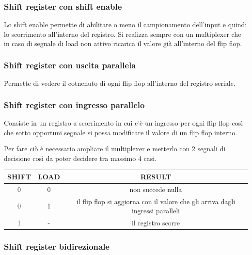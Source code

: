 \documentclass[a4paper]{book}
\begin{document}
\subsubsection*{Shift register con shift enable}

Lo shift enable permette di abilitare o meno il campionamento dell'input e quindi lo scorrimento all'interno del registro.
Si realizza sempre con un multiplexer che in caso di segnale di load non attivo ricarica il valore già all'interno del flip flop.

\subsubsection*{Shift register con uscita parallela}

Permette di vedere il cotnenuto di ogni flip flop all'interno del registro seriale.

\subsubsection*{Shift register con ingresso parallelo}

Consiste in un registro a scorrimento in cui c'è un ingresso per ogni flip flop così che sotto opportuni segnale si possa modificare il valore di un flip flop interno.

Per fare ciò è necessario ampliare il multiplexer e metterlo con 2 segnali di decisione così da poter decidere tra massimo 4 casi.\\
\begin{tabular}{|c|c|c|}
\hline
SHIFT & LOAD & RESULT \\
\hline
0 & 0 & non succede nulla \\
\hline
0 & 1 & il flip flop si aggiorna con il valore che gli arriva dagli ingressi paralleli \\
\hline
1 & - & il registro scorre \\
\hline
\end{tabular}

\subsubsection*{Shift register bidirezionale}
\end{document}
